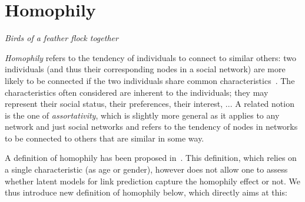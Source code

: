 \section{Homophily}
\label{sec:homophily}
\vspace{-0.2cm}
\begin{center} \emph{Birds of a feather flock together} \end{center}

\vspace{0.1cm}

\textit{Homophily} refers to the tendency of individuals to connect to similar others: two individuals (and thus their corresponding nodes in a social network) are more likely to be connected if the two individuals share common characteristics~\cite{mcpherson2001birds,lazarsfeld1954friendship}. The characteristics often considered are inherent to the individuals; they may represent their social status, their preferences, their interest, ... A related notion is the one of {\it assortativity}, which is slightly more general as it applies to any network and just social networks and refers to the tendency of nodes in networks to be connected to others that are similar in some way.

A definition of homophily has been proposed in~\cite{la2010randomization}. This definition, which relies on a single characteristic (as age or gender), however does not allow one to assess whether latent models for link prediction capture the homophily effect or not. We thus introduce  new definition of homophily below, which directly aims at this:
%

